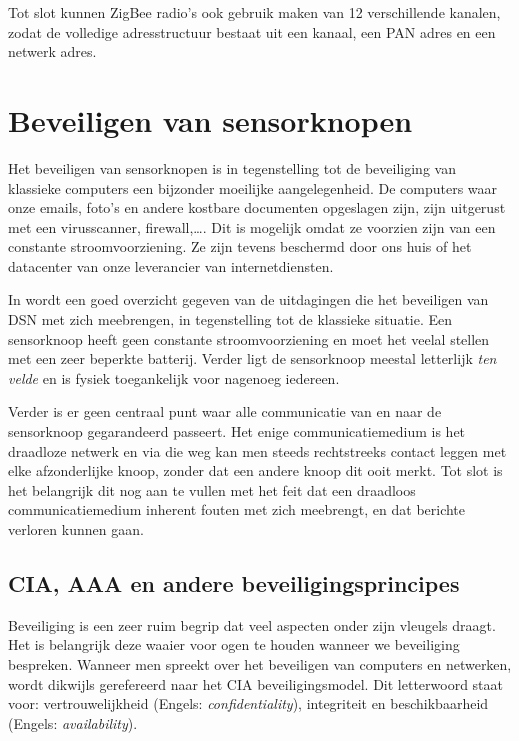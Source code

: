 Tot slot kunnen ZigBee radio's ook gebruik maken van 12 verschillende kanalen,
zodat de volledige adresstructuur bestaat uit een kanaal, een PAN adres en een
netwerk adres.

\section{Beveiligen van sensorknopen}
\label{section:beveiligen}

Het beveiligen van sensorknopen is in tegenstelling tot de beveiliging van
klassieke computers een bijzonder moeilijke aangelegenheid. De computers waar
onze emails, foto's en andere kostbare documenten opgeslagen zijn, zijn
uitgerust met een virusscanner, firewall,\dots. Dit is mogelijk omdat ze
voorzien zijn van een constante stroomvoorziening. Ze zijn tevens beschermd
door ons huis of het datacenter van onze leverancier van internetdiensten.

In \citep{dargie2010fundamentals} wordt een goed overzicht gegeven van de
uitdagingen die het beveiligen van DSN met zich meebrengen, in tegenstelling
tot de klassieke situatie. Een sensorknoop heeft geen constante
stroomvoorziening en moet het veelal stellen met een zeer beperkte batterij.
Verder ligt de sensorknoop meestal letterlijk \emph{ten velde} en is fysiek
toegankelijk voor nagenoeg iedereen.

Verder is er geen centraal punt waar alle communicatie van en naar de
sensorknoop gegarandeerd passeert. Het enige communicatiemedium is het
draadloze netwerk en via die weg kan men steeds rechtstreeks contact leggen met
elke afzonderlijke knoop, zonder dat een andere knoop dit ooit merkt. Tot slot
is het belangrijk dit nog aan te vullen met het feit dat een draadloos
communicatiemedium inherent fouten met zich meebrengt, en dat berichte verloren
kunnen gaan.

\subsection{CIA, AAA en andere beveiligingsprincipes}
\label{subsection:cia}

Beveiliging is een zeer ruim begrip dat veel aspecten onder zijn vleugels
draagt. Het is belangrijk deze waaier voor ogen te houden wanneer we
beveiliging bespreken. Wanneer men spreekt over het beveiligen van computers en
netwerken, wordt dikwijls gerefereerd naar het CIA beveiligingsmodel. Dit
letterwoord staat voor: vertrouwelijkheid (Engels: \emph{confidentiality}),
integriteit en beschikbaarheid (Engels: \emph{availability}).


